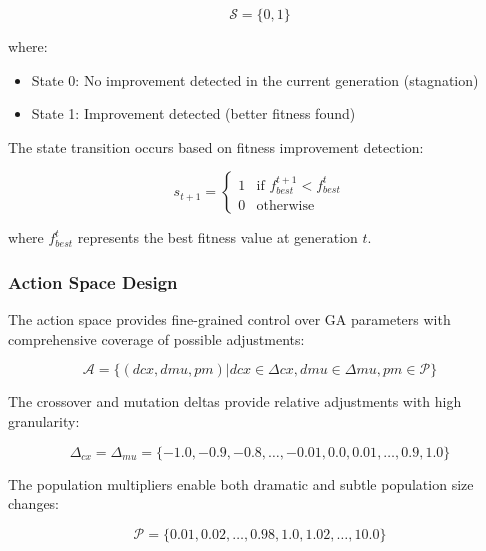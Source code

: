 \documentclass[12pt,a4paper]{article}
\begin{document}
\begin{equation}\label{Eq.rl_state_space}
\mathcal{S} = \{0, 1\}
\end{equation}

where:
\begin{itemize}
\item State 0: No improvement detected in the current generation (stagnation)
\item State 1: Improvement detected (better fitness found)
\end{itemize}

The state transition occurs based on fitness improvement detection:

\begin{equation}\label{Eq.state_transition}
s_{t+1} = \begin{cases}
1 & \text{if } f_{best}^{t+1} < f_{best}^t \\
0 & \text{otherwise}
\end{cases}
\end{equation}

where $f_{best}^t$ represents the best fitness value at generation $t$.

\subsubsection{Action Space Design}

The action space provides fine-grained control over GA parameters with comprehensive coverage of possible adjustments:

\begin{equation}\label{Eq.rl_actions}
\mathcal{A} = \{(dcx, dmu, pm) | dcx \in \Delta cx, dmu \in \Delta mu, pm \in \mathcal{P}\}
\end{equation}

The crossover and mutation deltas provide relative adjustments with high granularity:

\begin{equation}\label{Eq.delta_sets}
\Delta_{cx} = \Delta_{mu} = \{-1.0, -0.9, -0.8, \ldots, -0.01, 0.0, 0.01, \ldots, 0.9, 1.0\}
\end{equation}

The population multipliers enable both dramatic and subtle population size changes:

\begin{equation}\label{Eq.pop_multipliers}
\mathcal{P} = \{0.01, 0.02, \ldots, 0.98, 1.0, 1.02, \ldots, 10.0\}
\end{equation}
\end{document}
